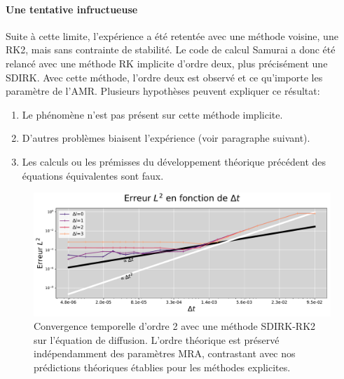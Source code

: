    \paragraph{Une tentative infructueuse}
        Suite à cette limite, l'expérience a été retentée avec une méthode voisine, une RK2, mais sans contrainte de stabilité. 
        Le code de calcul Samurai a donc été relancé avec une méthode RK implicite d'ordre deux, plus précisément une SDIRK.
        Avec cette méthode, l'ordre deux est observé et ce qu'importe les paramètre de l'AMR.
        Plusieurs hypothèses peuvent expliquer ce résultat:
        \begin{enumerate}
            \item Le phénomène n'est pas présent sur cette méthode implicite.
            \item D'autres problèmes biaisent l'expérience (voir paragraphe suivant).
            \item Les calculs ou les prémisses du développement théorique précédent des équations équivalentes sont faux.
        \end{enumerate}
        \begin{figure}[htbp]
            \centering
            \includegraphics[width=\textwidth]{media/4_travail/1_AMR/convergence/convergence_temps_SDIRK_ORDRE2.pdf}
            \caption{Convergence temporelle d'ordre 2 avec une méthode SDIRK-RK2 sur l'équation de diffusion. 
                        L'ordre théorique est préservé indépendamment des paramètres MRA, contrastant avec 
                        nos prédictions théoriques établies pour les méthodes explicites.}
            \label{fig:convergence_sdirk}
        \end{figure}

